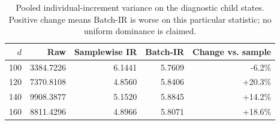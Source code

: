 \begin{table}[htbp]
\centering\small
\caption{Pooled individual-increment variance on the diagnostic child states. Positive change means Batch-IR is worse on this particular statistic; no uniform dominance is claimed.}\label{tab:extended-increments}
\begin{tabular}{@{}rrrrr@{}}
\toprule
$d$ & Raw & Samplewise IR & Batch-IR & Change vs. sample\\
\midrule
100 & 3384.7226 & 6.1441 & 5.7609 & -6.2\%\\
120 & 7370.8108 & 4.8560 & 5.8406 & +20.3\%\\
140 & 9908.3877 & 5.1520 & 5.8845 & +14.2\%\\
160 & 8811.4296 & 4.8966 & 5.8071 & +18.6\%\\
\bottomrule
\end{tabular}
\end{table}
